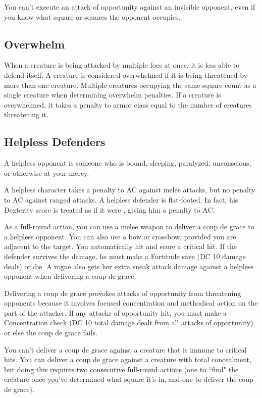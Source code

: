 You can't execute an attack of opportunity against an invisible opponent, even if you know what square or squares the opponent occupies.

\subsection{Overwhelm}
When a creature is being attacked by multiple foes at once, it is less able to defend itself. A creature is considered overwhelmed if it is being threatened by more than one creature. Multiple creatures occupying the same square count as a single creature when determining overwhelm penalties. If a creature is overwhelmed, it takes a penalty to armor class equal to the number of creatures threatening it.

\subsection{Helpless Defenders}
A helpless opponent is someone who is bound, sleeping, paralyzed, unconscious, or otherwise at your mercy.

 A helpless character takes a  penalty to AC against melee attacks, but no penalty to AC against ranged attacks. A helpless defender is flat-footed. In fact, his Dexterity score is treated as if it were , giving him a  penalty to AC.

 As a full-round action, you can use a melee weapon to deliver a coup de grace to a helpless opponent. You can also use a bow or crossbow, provided you are adjacent to the target. You automatically hit and score a critical hit. If the defender survives the damage, he must make a Fortitude save (DC 10 \add damage dealt) or die. A rogue also gets her extra sneak attack damage against a helpless opponent when delivering a coup de grace.

Delivering a coup de grace provokes attacks of opportunity from
threatening opponents because it involves focused concentration
and methodical action on the part of the attacker. If any attacks of opportunity hit, you must make a Concentration check (DC 10 \add total damage dealt from all attacks of opportunity) or else the coup de grace fails.

You can't deliver a coup de grace against a creature that is immune to critical hits. You can deliver a coup de grace against a creature with total concealment, but doing this requires two consecutive full-round actions (one to ``find" the creature once you've determined what square it's in, and one to deliver the coup de grace).

